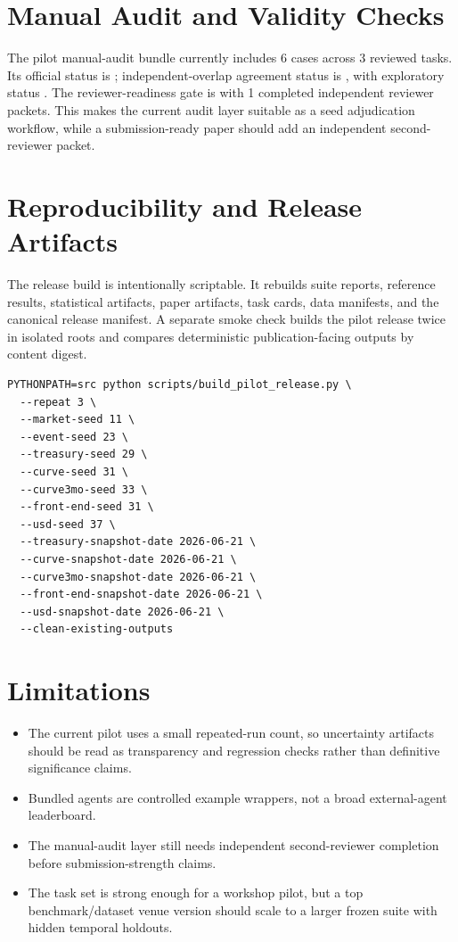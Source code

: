\documentclass[11pt]{article}
\begin{document}
\section{Manual Audit and Validity Checks}
The pilot manual-audit bundle currently includes 6 cases across 3 reviewed tasks. Its official status is ; independent-overlap agreement status is , with exploratory status . The reviewer-readiness gate is  with 1 completed independent reviewer packets. This makes the current audit layer suitable as a seed adjudication workflow, while a submission-ready paper should add an independent second-reviewer packet.



\section{Reproducibility and Release Artifacts}
The release build is intentionally scriptable. It rebuilds suite reports, reference results, statistical artifacts, paper artifacts, task cards, data manifests, and the canonical release manifest. A separate smoke check builds the pilot release twice in isolated roots and compares deterministic publication-facing outputs by content digest.

\begin{verbatim}
PYTHONPATH=src python scripts/build_pilot_release.py \
  --repeat 3 \
  --market-seed 11 \
  --event-seed 23 \
  --treasury-seed 29 \
  --curve-seed 31 \
  --curve3mo-seed 33 \
  --front-end-seed 31 \
  --usd-seed 37 \
  --treasury-snapshot-date 2026-06-21 \
  --curve-snapshot-date 2026-06-21 \
  --curve3mo-snapshot-date 2026-06-21 \
  --front-end-snapshot-date 2026-06-21 \
  --usd-snapshot-date 2026-06-21 \
  --clean-existing-outputs
\end{verbatim}

\section{Limitations}
\begin{itemize}[leftmargin=*]
\item The current pilot uses a small repeated-run count, so uncertainty artifacts should be read as transparency and regression checks rather than definitive significance claims.
\item Bundled agents are controlled example wrappers, not a broad external-agent leaderboard.
\item The manual-audit layer still needs independent second-reviewer completion before submission-strength claims.
\item The task set is strong enough for a workshop pilot, but a top benchmark/dataset venue version should scale to a larger frozen suite with hidden temporal holdouts.
\end{itemize}
\end{document}
